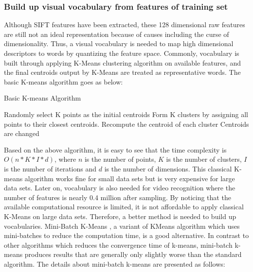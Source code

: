 \subsubsection{Build up visual vocabulary from features of training set}
Although SIFT features have been extracted, these 128 dimensional raw features are still not an ideal representation because of causes including the curse of dimensionality. Thus, a visual vocabulary is needed to map high dimensional descriptors to words by quantizing the feature space. Commonly, vocabulary is built through applying K-Means \cite{lloyd1982least} clustering algorithm on available features, and the final centroids output by K-Means are treated as representative words. The basic K-means algorithm goes as below:

\begin{algorithm}
  \caption{Basic K-means Algorithm}
  \begin {algorithmic}[1]
  \State Randomly select K points as the initial centroids
  \Do 
    \State Form K clusters by assigning all points to their closest centroids.
    \State Recompute the centroid of each cluster
  \doWhile Centroids are changed
  \end{algorithmic}
\end{algorithm}

\noindent Based on the above algorithm, it is easy to see that the time complexity is $O(n*K*I*d)$, where $n$ is the number of points, $K$ is the number of clusters, $I$ is the number of iterations and $d$ is the number of dimensions. This classical K-means algorithm works fine for small data sets but is very expensive for large data sets. Later on, vocabulary is also needed for video recognition where the number of features is nearly 0.4 million after sampling. By noticing that the available computational resource is limited, it is not affordable to apply classical K-Means on large data sets. Therefore, a better method is needed to build up vocabularies.  Mini-Batch K-Means \cite{sculley2010web}, a variant of KMeans algorithm which uses mini-batches to reduce the computation time, is a good alternative. In contrast to other algorithms which reduces the convergence time of k-means, mini-batch k-means produces results that are generally only slightly worse than the standard algorithm. The details about mini-batch k-means are presented as follows:

